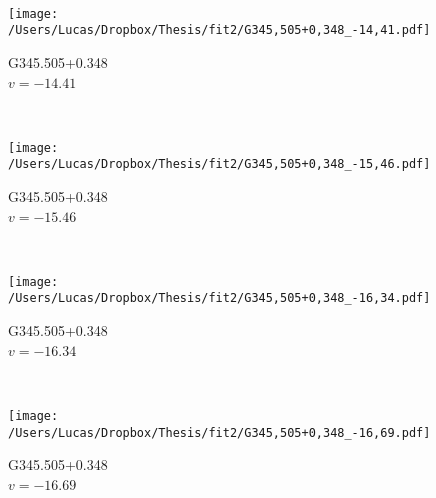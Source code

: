 \begin{figure*}[t]
\begin{subfigure}[t]{0.3\textwidth}
	\end{subfigure}
	~
	\begin{subfigure}[t]{0.3\textwidth}
		\texttt{[image: /Users/Lucas/Dropbox/Thesis/fit2/G345,505+0,348\_-14,41.pdf]}
		\caption[]{G345.505+0.348\\$v=-14.41$\,\kms}
	\end{subfigure}
	~
	\begin{subfigure}[t]{0.3\textwidth}
		\texttt{[image: /Users/Lucas/Dropbox/Thesis/fit2/G345,505+0,348\_-15,46.pdf]}
		\caption[]{G345.505+0.348\\$v=-15.46$\,\kms}
	\end{subfigure}
	~
	\begin{subfigure}[t]{0.3\textwidth}
		\texttt{[image: /Users/Lucas/Dropbox/Thesis/fit2/G345,505+0,348\_-16,34.pdf]}
		\caption[]{G345.505+0.348\\$v=-16.34$\,\kms}
	\end{subfigure}
	~
	\begin{subfigure}[t]{0.3\textwidth}
		\texttt{[image: /Users/Lucas/Dropbox/Thesis/fit2/G345,505+0,348\_-16,69.pdf]}
		\caption[]{G345.505+0.348\\$v=-16.69$\,\kms}
	\end{subfigure}
	~
\end{figure*}
\clearpage
